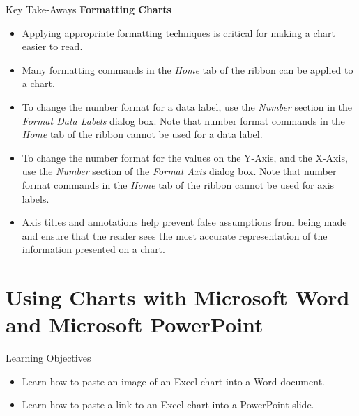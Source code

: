 \begin{center}
	\begin{tkwbox}{Key Take-Aways}
		\textbf{Formatting Charts}
		\\
		\begin{itemize}
			\setlength{\itemsep}{0pt}
			\setlength{\parskip}{0pt}
			\setlength{\parsep}{0pt}

			\item Applying appropriate formatting techniques is critical for making a chart easier to read.
			\item Many formatting commands in the \textit{Home} tab of the ribbon can be applied to a chart.
			\item To change the number format for a data label, use the \textit{Number} section in the \textit{Format Data Labels} dialog box. Note that number format commands in the \textit{Home} tab of the ribbon cannot be used for a data label.
			\item To change the number format for the values on the Y-Axis, and the X-Axis, use the \textit{Number} section of the \textit{Format Axis} dialog box. Note that number format commands in the \textit{Home} tab of the ribbon cannot be used for axis labels.
			\item Axis titles and annotations help prevent false assumptions from being made and ensure that the reader sees the most accurate representation of the information presented on a chart.
			
		\end{itemize}
	\end{tkwbox}
\end{center}

\section{Using Charts with Microsoft Word and Microsoft PowerPoint}

\begin{center}
	\begin{objbox}{Learning Objectives}
		\begin{itemize}
			\setlength{\itemsep}{0pt}
			\setlength{\parskip}{0pt}
			\setlength{\parsep}{0pt}

			\item Learn how to paste an image of an Excel chart into a Word document.
			\item Learn how to paste a link to an Excel chart into a PowerPoint slide.
			
		\end{itemize}
	\end{objbox}
\end{center}

